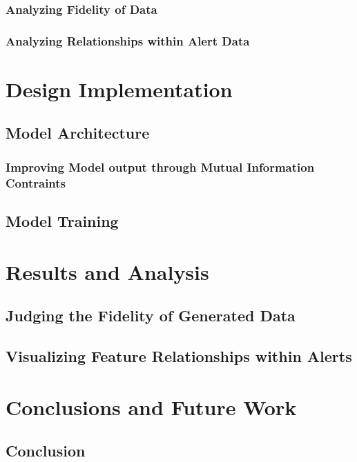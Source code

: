 \documentclass[12pt,american]{report}
\begin{document}
\subsection{Analyzing Fidelity of Data}

\subsection{Analyzing Relationships within Alert Data}

\chapter{Design Implementation}

\section{Model Architecture}

\subsection{Improving Model output through Mutual Information Contraints}

\section{Model Training}

\chapter{Results and Analysis}

\section{Judging the Fidelity of Generated Data}

\section{Visualizing Feature Relationships within Alerts}

\chapter{Conclusions and Future Work}

\section{Conclusion}
\end{document}
